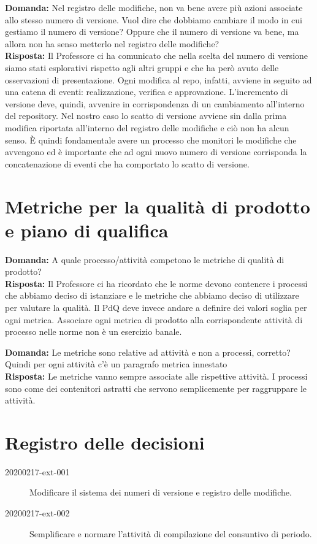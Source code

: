 \documentclass{article}
\begin{document}
\textbf{Domanda:} Nel registro delle modifiche, non va bene avere più azioni associate allo stesso numero di versione.
Vuol dire che dobbiamo cambiare il modo in cui gestiamo il numero di versione?
Oppure che il numero di versione va bene, ma allora non ha senso metterlo nel registro delle modifiche?\\
\textbf{Risposta:} Il Professore ci ha comunicato che nella scelta del numero di versione siamo stati esplorativi rispetto agli altri gruppi e che ha però avuto delle osservazioni di presentazione.
Ogni modifica al repo, infatti, avviene in seguito ad una catena di eventi: realizzazione, verifica e approvazione.
L'incremento di versione deve, quindi, avvenire in corrispondenza di un cambiamento all'interno del repository.
Nel nostro caso lo scatto di versione avviene sin dalla prima modifica riportata all'interno del registro delle modifiche e ciò non ha alcun senso.
È quindi fondamentale avere un processo che monitori le modifiche che avvengono ed è importante che ad ogni nuovo numero di versione corrisponda la concatenazione di eventi che ha comportato lo scatto di versione.

\section{Metriche per la qualità di prodotto e piano di qualifica}%
\label{sec:metriche_per_la_qualita_di_prodotto_e_piano_di_qualifica}

\textbf{Domanda:} A quale processo/attività competono le metriche di qualità di prodotto?\\
\textbf{Risposta:} Il Professore ci ha ricordato che le norme devono contenere i processi che abbiamo deciso di istanziare e le metriche che abbiamo deciso di utilizzare per valutare la qualità.
Il PdQ deve invece andare a definire dei valori soglia per ogni metrica.
Associare ogni metrica di prodotto alla corrispondente attività di processo nelle norme non è un esercizio banale.

\textbf{Domanda:} Le metriche sono relative ad attività e non a processi, corretto? Quindi per ogni attività c'è un paragrafo metrica innestato\\
\textbf{Risposta:} Le metriche vanno sempre associate alle rispettive attività.
I processi sono come dei contenitori astratti che servono semplicemente per raggruppare le attività.

\newpage
\section{Registro delle decisioni}%
\label{sec:registro_delle_decisioni}

\begin{description}
  \item[20200217-ext-001] Modificare il sistema dei numeri di versione e registro delle modifiche.
  \item[20200217-ext-002] Semplificare e normare l'attività di compilazione del consuntivo di periodo.  
\end{description}

\end{document}
